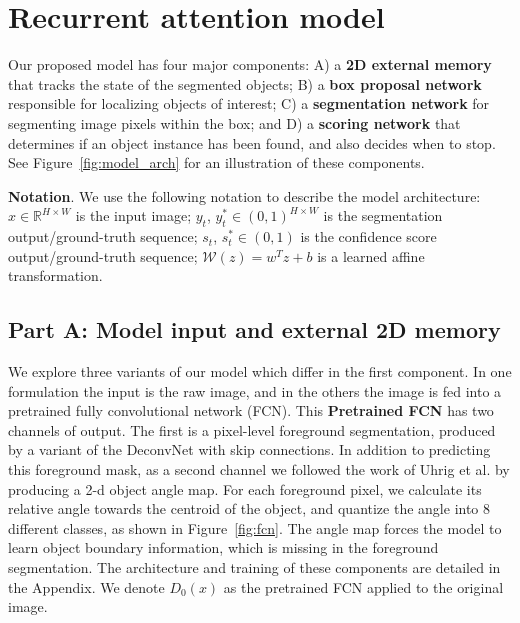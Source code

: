 \section{Recurrent attention model} 

Our proposed model has four major components: A) a \textbf{2D external memory}
that tracks the state of the segmented objects; B) a \textbf{box proposal network}
responsible for localizing objects of interest;  C) a \textbf{segmentation network} 
for segmenting image pixels within the box; and D) a \textbf{scoring network} 
that determines if an object instance has been found, and also decides when to stop.
See Figure~\ref{fig:model_arch} for an illustration of these components.



\textbf{Notation}. We use the following notation to describe the model
architecture: $x \in \mathbb{R}^{H \times W}$
is the input image; $y_{t}$, $y^*_{t} \in (0, 1)^{H \times W}$ is the
segmentation  output/ground-truth sequence; $s_{t}$, $s^*_{t} \in (0, 1)$ is
the confidence score output/ground-truth sequence; $\mathcal{W}(z) = w^T z + b$ is a learned
affine transformation.

\subsection{Part A: Model input and external 2D memory}

We explore three variants of our model which differ in the first component. In
one formulation the input is the raw image, and in the others the image is fed
into a pretrained fully convolutional network (FCN). This \textbf{Pretrained
FCN} has two channels of output.  The first is a pixel-level foreground
segmentation, produced by a variant of the DeconvNet \cite{noh15deconv} with
skip connections. In addition to predicting this foreground mask, as a second
channel we followed the work of Uhrig et al. \cite{uhrig16insseg}  by producing
a 2-d object angle map. For each foreground pixel, we calculate its relative
angle towards the centroid of the object, and quantize the angle into 8
different classes, as shown in Figure~\ref{fig:fcn}. The angle map forces the
model to learn object boundary information, which is missing in the foreground
segmentation.  The architecture and training of these components are detailed
in the Appendix. We denote $D_0(x)$ as the pretrained FCN applied to the
original image.

